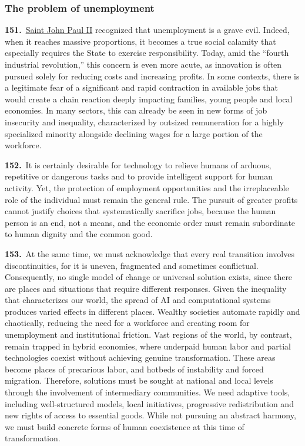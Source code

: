 \documentclass{article}
\begin{document}
\subsubsection{The problem of unemployment}

\textbf{151.}\ \href{https://www.vatican.va/content/john-paul-ii/en.html}{Saint John Paul II} recognized that unemployment is a grave evil. Indeed, when it reaches massive proportions, it becomes a true social calamity that especially requires the State to exercise responsibility.\cite{n153} Today, amid the ``fourth industrial revolution,'' this concern is even more acute, as innovation is often pursued solely for reducing costs and increasing profits.\cite{n154} In some contexts, there is a legitimate fear of a significant and rapid contraction in available jobs that would create a chain reaction deeply impacting families, young people and local economies. In many sectors, this can already be seen in new forms of job insecurity and inequality, characterized by outsized remuneration for a highly specialized minority alongside declining wages for a large portion of the workforce.

\textbf{152.}\ It is certainly desirable for technology to relieve humans of arduous, repetitive or dangerous tasks and to provide intelligent support for human activity. Yet, the protection of employment opportunities and the irreplaceable role of the individual must remain the general rule. The pursuit of greater profits cannot justify choices that systematically sacrifice jobs, because the human person is an end, not a means, and the economic order must remain subordinate to human dignity and the common good.

\textbf{153.}\ At the same time, we must acknowledge that every real transition involves discontinuities, for it is uneven, fragmented and sometimes conflictual. Consequently, no single model of change or universal solution exists, since there are places and situations that require different responses. Given the inequality that characterizes our world, the spread of AI and computational systems produces varied effects in different places. Wealthy societies automate rapidly and chaotically, reducing the need for a workforce and creating room for unemployment and institutional friction. Vast regions of the world, by contrast, remain trapped in hybrid economies, where underpaid human labor and partial technologies coexist without achieving genuine transformation. These areas become places of precarious labor, and hotbeds of instability and forced migration. Therefore, solutions must be sought at national and local levels through the involvement of intermediary communities. We need adaptive tools, including well-structured models, local initiatives, progressive redistribution and new rights of access to essential goods. While not pursuing an abstract harmony, we must build concrete forms of human coexistence at this time of transformation.
\end{document}
